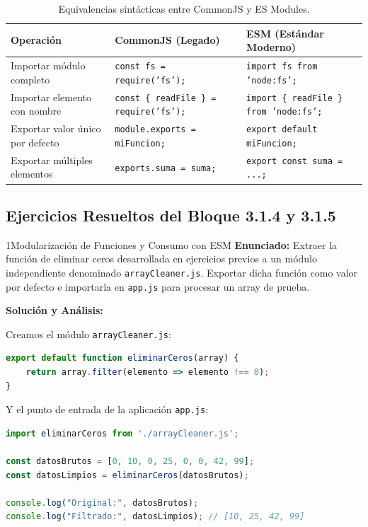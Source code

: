 \begin{table}[htbp]
\centering
\small
\begin{tabularx}{\textwidth}{p{4.2cm} X X}
\toprule
\textbf{Operación} & \textbf{CommonJS (Legado)} & \textbf{ESM (Estándar Moderno)} \\
\midrule
Importar módulo completo & \texttt{const fs = require('fs');} & \texttt{import fs from 'node:fs';} \\
Importar elemento con nombre & \texttt{const \{ readFile \} = require('fs');} & \texttt{import \{ readFile \} from 'node:fs';} \\
Exportar valor único por defecto & \texttt{module.exports = miFuncion;} & \texttt{export default miFuncion;} \\
Exportar múltiples elementos & \texttt{exports.suma = suma;} & \texttt{export const suma = ...;} \\
\bottomrule
\end{tabularx}
\caption{Equivalencias sintácticas entre CommonJS y ES Modules.}
\label{tab:commonjs-vs-esm}
\end{table}

\subsection{Ejercicios Resueltos del Bloque 3.1.4 y 3.1.5}

\begin{ejercicioresuelto}{1}{Modularización de Funciones y Consumo con ESM}
\textbf{Enunciado:} Extraer la función de eliminar ceros desarrollada en ejercicios previos a un módulo independiente denominado \texttt{arrayCleaner.js}. Exportar dicha función como valor por defecto e importarla en \texttt{app.js} para procesar un array de prueba.

\textbf{Solución y Análisis:}

Creamos el módulo \texttt{arrayCleaner.js}:
\begin{lstlisting}[language=javascript, caption={arrayCleaner.js}]
export default function eliminarCeros(array) {
    return array.filter(elemento => elemento !== 0);
}
\end{lstlisting}

Y el punto de entrada de la aplicación \texttt{app.js}:
\begin{lstlisting}[language=javascript, caption={app.js con importacion ESM}]
import eliminarCeros from './arrayCleaner.js';

const datosBrutos = [0, 10, 0, 25, 0, 0, 42, 99];
const datosLimpios = eliminarCeros(datosBrutos);

console.log("Original:", datosBrutos);
console.log("Filtrado:", datosLimpios); // [10, 25, 42, 99]
\end{lstlisting}
\end{ejercicioresuelto}

